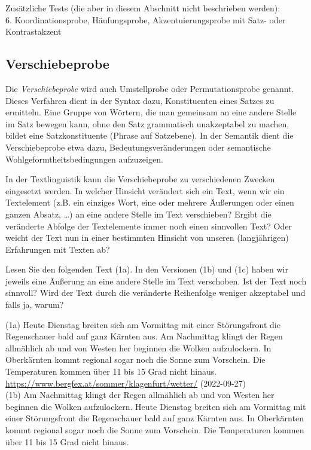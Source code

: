 \documentclass[
  letterpaper,
]{scrbook}
\begin{document}
Zusätzliche Tests (die aber in diesem Abschnitt nicht beschrieben
werden):\\
6. Koordinationsprobe, Häufungsprobe, Akzentuierungsprobe mit Satz- oder
Kontrastakzent

\hypertarget{verschiebeprobe}{%
\subsection{Verschiebeprobe}\label{verschiebeprobe}}

Die \emph{Verschiebeprobe} wird auch Umstellprobe oder Permutationsprobe
genannt. Dieses Verfahren dient in der Syntax dazu, Konstituenten eines
Satzes zu ermitteln. Eine Gruppe von Wörtern, die man gemeinsam an eine
andere Stelle im Satz bewegen kann, ohne den Satz grammatisch
unakzeptabel zu machen, bildet eine Satzkonstituente (Phrase auf
Satzebene). In der Semantik dient die Verschiebeprobe etwa dazu,
Bedeutungsveränderungen oder semantische Wohlgeformtheitsbedingungen
aufzuzeigen.

In der Textlinguistik kann die Verschiebeprobe zu verschiedenen Zwecken
eingesetzt werden. In welcher Hinsicht verändert sich ein Text, wenn wir
ein Textelement (z.B. ein einziges Wort, eine oder mehrere Äußerungen
oder einen ganzen Absatz, \ldots) an eine andere Stelle im Text
verschieben? Ergibt die veränderte Abfolge der Textelemente immer noch
einen sinnvollen Text? Oder weicht der Text nun in einer bestimmten
Hinsicht von unseren (langjährigen) Erfahrungen mit Texten ab?

Lesen Sie den folgenden Text (1a). In den Versionen (1b) und (1c) haben
wir jeweils eine Äußerung an eine andere Stelle im Text verschoben. Ist
der Text noch sinnvoll? Wird der Text durch die veränderte Reihenfolge
weniger akzeptabel und falls ja, warum?

(1a) Heute Dienstag breiten sich am Vormittag mit einer Störungsfront
die Regenschauer bald auf ganz Kärnten aus. Am Nachmittag klingt der
Regen allmählich ab und von Westen her beginnen die Wolken aufzulockern.
In Oberkärnten kommt regional sogar noch die Sonne zum Vorschein. Die
Temperaturen kommen über 11 bis 15 Grad nicht hinaus.
\url{https://www.bergfex.at/sommer/klagenfurt/wetter/} (2022-09-27)\\

(1b) Am Nachmittag klingt der Regen allmählich ab und von Westen her
beginnen die Wolken aufzulockern. Heute Dienstag breiten sich am
Vormittag mit einer Störungsfront die Regenschauer bald auf ganz Kärnten
aus. In Oberkärnten kommt regional sogar noch die Sonne zum Vorschein.
Die Temperaturen kommen über 11 bis 15 Grad nicht hinaus.
\end{document}

